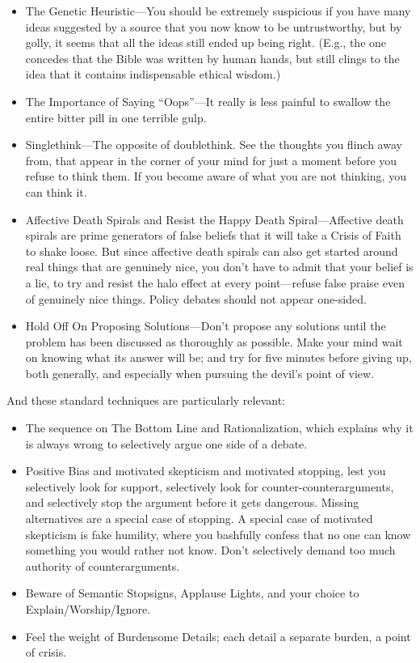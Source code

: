 \begin{itemize}
\item {
 The Genetic Heuristic---You should be extremely suspicious if you
have many ideas suggested by a source that you now know to be
untrustworthy, but by golly, it seems that all the ideas still ended up
being right. (E.g., the one concedes that the Bible was written by
human hands, but still clings to the idea that it contains
indispensable ethical wisdom.)}

\item {
 The Importance of Saying
``Oops''---It really is less painful
to swallow the entire bitter pill in one terrible gulp.}

\item {
 Singlethink---The opposite of doublethink. See the thoughts you
flinch away from, that appear in the corner of your mind for just a
moment before you refuse to think them. If you become aware of what you
are not thinking, you can think it.}

\item {
 Affective Death Spirals and Resist the Happy Death
Spiral---Affective death spirals are prime generators of false beliefs
that it will take a Crisis of Faith to shake loose. But since affective
death spirals can also get started around real things that are
genuinely nice, you don't have to admit that your
belief is a lie, to try and resist the halo effect at every
point---refuse false praise even of genuinely nice things. Policy
debates should not appear one-sided.}

\item {
 Hold Off On Proposing Solutions---Don't propose
any solutions until the problem has been discussed as thoroughly as
possible. Make your mind wait on knowing what its answer will be; and
try for five minutes before giving up, both generally, and especially
when pursuing the devil's point of view.}
\end{itemize}

{
 And these standard techniques are particularly relevant:}

\begin{itemize}
\item {
 The sequence on The Bottom Line and Rationalization, which
explains why it is always wrong to selectively argue one side of a
debate.}

\item {
 Positive Bias and motivated skepticism and motivated stopping,
lest you selectively look for support, selectively look for
counter-counterarguments, and selectively stop the argument before it
gets dangerous. Missing alternatives are a special case of stopping. A
special case of motivated skepticism is fake humility, where you
bashfully confess that no one can know something you would rather not
know. Don't selectively demand too much authority of
counterarguments.}

\item {
 Beware of Semantic Stopsigns, Applause Lights, and your choice to
Explain/Worship/Ignore.}

\item {
 Feel the weight of Burdensome Details; each detail a separate
 burden, a point of crisis.}
\end{itemize}

